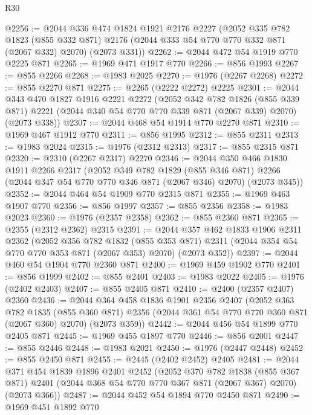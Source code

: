 \begin{lexlean}{R30}
\begin{coremodule}
@2256 := @2044
    @336
    @474
    @1824
    @1921
    @2176
    @2227
    (@2052
      @335
      @782
      @1823
      (@855 @332 @871)
      @2176
      (@2044 @333 @54 @770 @770 @332 @871 (@2067 @332) @2070)
      (@2073 @331))
@2262 := @2044 @472 @54 @1919 @770 @2225 @871
@2265 := @1969 @471 @1917 @770
@2266 := @856 @1993
@2267 := @855 @2266
@2268 := @1983 @2025
@2270 := @1976 (@2267 @2268)
@2272 := @855 @2270 @871
@2275 := @2265 (@2222 @2272) @2225
@2301 := @2044
    @343
    @470
    @1827
    @1916
    @2221
    @2272
    (@2052
      @342
      @782
      @1826
      (@855 @339 @871)
      @2221
      (@2044 @340 @54 @770 @770 @339 @871 (@2067 @339) @2070)
      (@2073 @338))
@2307 := @2044 @468 @54 @1914 @770 @2270 @871
@2310 := @1969 @467 @1912 @770
@2311 := @856 @1995
@2312 := @855 @2311
@2313 := @1983 @2024
@2315 := @1976 (@2312 @2313)
@2317 := @855 @2315 @871
@2320 := @2310 (@2267 @2317) @2270
@2346 := @2044
    @350
    @466
    @1830
    @1911
    @2266
    @2317
    (@2052
      @349
      @782
      @1829
      (@855 @346 @871)
      @2266
      (@2044 @347 @54 @770 @770 @346 @871 (@2067 @346) @2070)
      (@2073 @345))
@2352 := @2044 @464 @54 @1909 @770 @2315 @871
@2355 := @1969 @463 @1907 @770
@2356 := @856 @1997
@2357 := @855 @2356
@2358 := @1983 @2023
@2360 := @1976 (@2357 @2358)
@2362 := @855 @2360 @871
@2365 := @2355 (@2312 @2362) @2315
@2391 := @2044
    @357
    @462
    @1833
    @1906
    @2311
    @2362
    (@2052
      @356
      @782
      @1832
      (@855 @353 @871)
      @2311
      (@2044 @354 @54 @770 @770 @353 @871 (@2067 @353) @2070)
      (@2073 @352))
@2397 := @2044 @460 @54 @1904 @770 @2360 @871
@2400 := @1969 @459 @1902 @770
@2401 := @856 @1999
@2402 := @855 @2401
@2403 := @1983 @2022
@2405 := @1976 (@2402 @2403)
@2407 := @855 @2405 @871
@2410 := @2400 (@2357 @2407) @2360
@2436 := @2044
    @364
    @458
    @1836
    @1901
    @2356
    @2407
    (@2052
      @363
      @782
      @1835
      (@855 @360 @871)
      @2356
      (@2044 @361 @54 @770 @770 @360 @871 (@2067 @360) @2070)
      (@2073 @359))
@2442 := @2044 @456 @54 @1899 @770 @2405 @871
@2445 := @1969 @455 @1897 @770
@2446 := @856 @2001
@2447 := @855 @2446
@2448 := @1983 @2021
@2450 := @1976 (@2447 @2448)
@2452 := @855 @2450 @871
@2455 := @2445 (@2402 @2452) @2405
@2481 := @2044
    @371
    @454
    @1839
    @1896
    @2401
    @2452
    (@2052
      @370
      @782
      @1838
      (@855 @367 @871)
      @2401
      (@2044 @368 @54 @770 @770 @367 @871 (@2067 @367) @2070)
      (@2073 @366))
@2487 := @2044 @452 @54 @1894 @770 @2450 @871
@2490 := @1969 @451 @1892 @770

\end{coremodule}
\end{lexlean}
